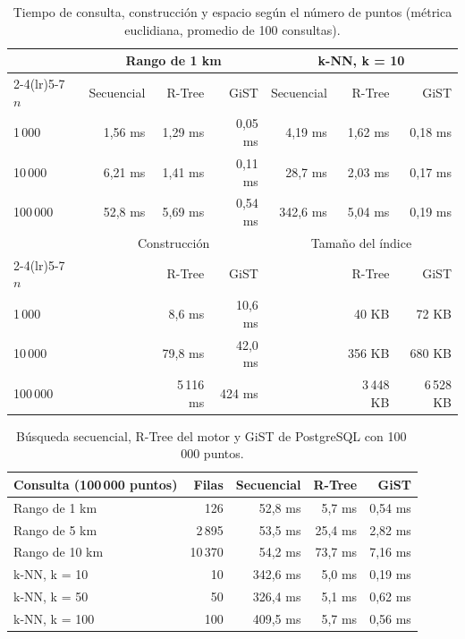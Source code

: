 \documentclass[11pt,a4paper]{article}
\begin{document}
\begin{table}[H]
\centering
\small
\begin{tabular}{lrrrrrr}
\toprule
& \multicolumn{3}{c}{Rango de 1 km} & \multicolumn{3}{c}{k-NN, k = 10} \\
\cmidrule(lr){2-4}\cmidrule(lr){5-7}
$n$ & Secuencial & R-Tree & GiST & Secuencial & R-Tree & GiST \\
\midrule
1\,000 & 1,56 ms & 1,29 ms & 0,05 ms & 4,19 ms & 1,62 ms & 0,18 ms \\
10\,000 & 6,21 ms & 1,41 ms & 0,11 ms & 28,7 ms & 2,03 ms & 0,17 ms \\
100\,000 & 52,8 ms & 5,69 ms & 0,54 ms & 342,6 ms & 5,04 ms & 0,19 ms \\
\midrule
& \multicolumn{3}{c}{Construcción} & \multicolumn{3}{c}{Tamaño del índice} \\
\cmidrule(lr){2-4}\cmidrule(lr){5-7}
$n$ & & R-Tree & GiST & & R-Tree & GiST \\
\midrule
1\,000 & & 8,6 ms & 10,6 ms & & 40 KB & 72 KB \\
10\,000 & & 79,8 ms & 42,0 ms & & 356 KB & 680 KB \\
100\,000 & & 5\,116 ms & 424 ms & & 3\,448 KB & 6\,528 KB \\
\bottomrule
\end{tabular}
\caption{Tiempo de consulta, construcción y espacio según el número de puntos (métrica euclidiana, promedio de 100 consultas).}
\label{tab:espacial-n}
\end{table}

\begin{table}[H]
\centering
\small
\begin{tabular}{lrrrr}
\toprule
Consulta (100\,000 puntos) & Filas & Secuencial & R-Tree & GiST \\
\midrule
Rango de 1 km & 126 & 52,8 ms & 5,7 ms & 0,54 ms \\
Rango de 5 km & 2\,895 & 53,5 ms & 25,4 ms & 2,82 ms \\
Rango de 10 km & 10\,370 & 54,2 ms & 73,7 ms & 7,16 ms \\
k-NN, k = 10 & 10 & 342,6 ms & 5,0 ms & 0,19 ms \\
k-NN, k = 50 & 50 & 326,4 ms & 5,1 ms & 0,62 ms \\
k-NN, k = 100 & 100 & 409,5 ms & 5,7 ms & 0,56 ms \\
\bottomrule
\end{tabular}
\caption{Búsqueda secuencial, R-Tree del motor y GiST de PostgreSQL con 100\,000 puntos.}
\label{tab:espacial-100k}
\end{table}
\end{document}
